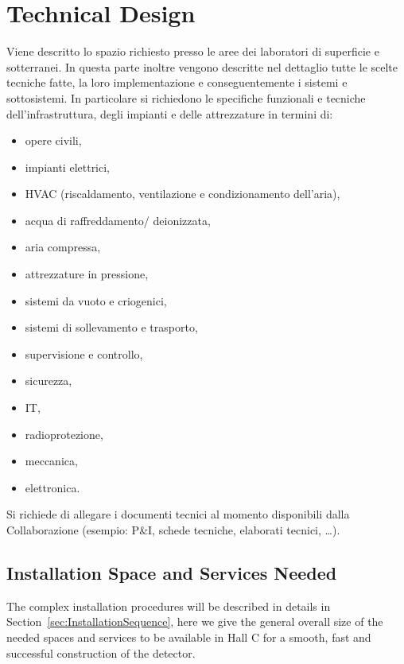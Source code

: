 \section{Technical Design}
\label{sec:TechnicalDesign}

{\bf\color{red}

Viene descritto lo spazio richiesto presso le aree dei laboratori di superficie e sotterranei.
In questa parte inoltre vengono descritte nel dettaglio tutte le scelte tecniche fatte, la loro implementazione e conseguentemente i sistemi e sottosistemi. In particolare si richiedono le specifiche funzionali e tecniche dell’infrastruttura, degli impianti e delle attrezzature in termini di:
\begin{itemize}
\item opere civili, 
\item impianti elettrici, 
\item HVAC (riscaldamento, ventilazione e condizionamento dell’aria), 
\item acqua di raffreddamento/ deionizzata, 
\item aria compressa,
\item attrezzature in pressione, 
\item sistemi da vuoto e criogenici, 
\item sistemi di sollevamento e trasporto, 
\item supervisione e controllo, 
\item sicurezza, 
\item  IT, 
\item radioprotezione, 
\item meccanica, 
\item elettronica.
\end{itemize}
Si richiede di allegare i documenti tecnici al momento disponibili dalla Collaborazione (esempio: P\&I, schede tecniche, elaborati tecnici, …).
}

\vspace{1cm}

\subsection{Installation Space and Services Needed}
\label{sec:SpaceAndService}

The complex installation procedures will be described in details in Section~\ref{sec:InstallationSequence}, here we give the general overall size of the needed spaces and services to be available in Hall C for a smooth, fast and successful construction of the \DSks detector.


